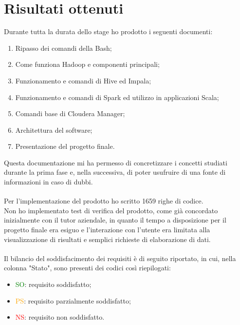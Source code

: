 \section{Risultati ottenuti}
Durante tutta la durata dello stage ho prodotto i seguenti documenti:
\begin{enumerate}
	\item Ripasso dei comandi della \gls{Bash};
	\item Come funziona Hadoop e componenti principali;
	\item Funzionamento e comandi di Hive ed Impala;
	\item Funzionamento e comandi di Spark ed utilizzo in applicazioni Scala;
	\item Comandi base di Cloudera Manager;
	\item Architettura del software;
	\item Presentazione del progetto finale.
\end{enumerate}
Questa documentazione mi ha permesso di concretizzare i concetti studiati durante la prima fase e, nella successiva, di poter usufruire di una fonte di informazioni in caso di dubbi.\\\\
Per l'implementazione del prodotto ho scritto 1659 righe di codice.\\
Non ho implementato test di verifica del prodotto, come già concordato inizialmente con il tutor aziendale, in quanto il tempo a disposizione per il progetto finale era esiguo e l'interazione con l'utente era limitata alla visualizzazione di risultati e semplici richieste di elaborazione di dati.\\\\
Il bilancio del soddisfacimento dei requisiti è di seguito riportato, in cui, nella colonna "Stato", sono presenti dei codici così riepilogati:
\begin{itemize}
	\item \textcolor{green}{SO}: requisito soddisfatto;
	\item \textcolor{orange}{PS}: requisito parzialmente soddisfatto;
	\item \textcolor{red}{NS}: requisito non soddisfatto.
\end{itemize}

